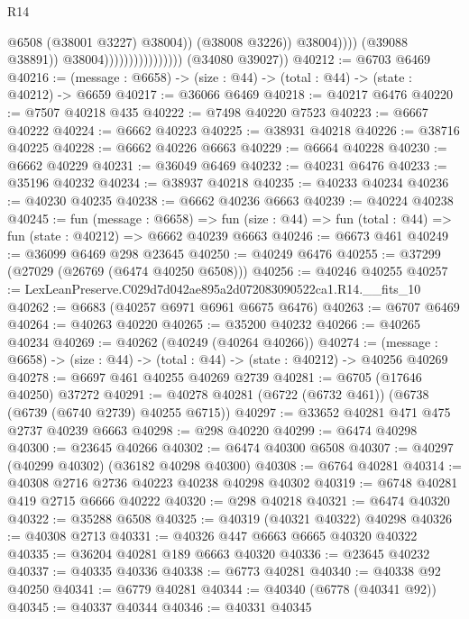 \begin{lexlean}{R14}
\begin{coremodule}
                                                      @6508
                                                      (@38001 @3227)
                                                      @38004))
                                                  (@38008 @3226))
                                                @38004))))
                                        (@39088 @38891))
                                      @38004))))))))))))))))
      (@34080 @39027))
@40212 := @6703 @6469
@40216 := (message : @6658) -> (size : @44) -> (total : @44) -> (state : @40212) -> @6659
@40217 := @36066 @6469
@40218 := @40217 @6476
@40220 := @7507 @40218 @435
@40222 := @7498 @40220 @7523
@40223 := @6667 @40222
@40224 := @6662 @40223
@40225 := @38931 @40218
@40226 := @38716 @40225
@40228 := @6662 @40226 @6663
@40229 := @6664 @40228
@40230 := @6662 @40229
@40231 := @36049 @6469
@40232 := @40231 @6476
@40233 := @35196 @40232
@40234 := @38937 @40218
@40235 := @40233 @40234
@40236 := @40230 @40235
@40238 := @6662 @40236 @6663
@40239 := @40224 @40238
@40245 := fun (message : @6658) =>
  fun (size : @44) => fun (total : @44) => fun (state : @40212) => @6662 @40239 @6663
@40246 := @6673 @461
@40249 := @36099 @6469 @298 @23645
@40250 := @40249 @6476
@40255 := @37299 (@27029 (@26769 (@6474 @40250 @6508)))
@40256 := @40246 @40255
@40257 := LexLeanPreserve.C029d7d042ae895a2d072083090522ca1.R14.__fits_10
@40262 := @6683 (@40257 @6971 @6961 @6675 @6476)
@40263 := @6707 @6469
@40264 := @40263 @40220
@40265 := @35200 @40232
@40266 := @40265 @40234
@40269 := @40262 (@40249 (@40264 @40266))
@40274 := (message : @6658) -> (size : @44) -> (total : @44) -> (state : @40212) -> @40256 @40269
@40278 := @6697 @461 @40255 @40269 @2739
@40281 := @6705 (@17646 @40250) @37272
@40291 := @40278 @40281 (@6722 (@6732 @461)) (@6738 (@6739 (@6740 @2739) @40255 @6715))
@40297 := @33652 @40281 @471 @475 @2737 @40239 @6663
@40298 := @298 @40220
@40299 := @6474 @40298
@40300 := @23645 @40266
@40302 := @6474 @40300 @6508
@40307 := @40297 (@40299 @40302) (@36182 @40298 @40300)
@40308 := @6764 @40281
@40314 := @40308 @2716 @2736 @40223 @40238 @40298 @40302
@40319 := @6748 @40281 @419 @2715 @6666 @40222
@40320 := @298 @40218
@40321 := @6474 @40320
@40322 := @35288 @6508
@40325 := @40319 (@40321 @40322) @40298
@40326 := @40308 @2713
@40331 := @40326 @447 @6663 @6665 @40320 @40322
@40335 := @36204 @40281 @189 @6663 @40320
@40336 := @23645 @40232
@40337 := @40335 @40336
@40338 := @6773 @40281
@40340 := @40338 @92 @40250
@40341 := @6779 @40281
@40344 := @40340 (@6778 (@40341 @92))
@40345 := @40337 @40344
@40346 := @40331 @40345

\end{coremodule}
\end{lexlean}
